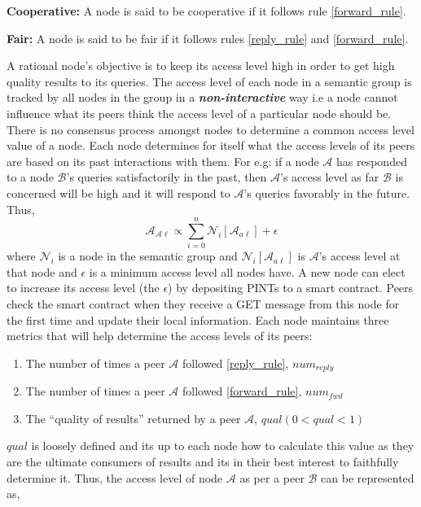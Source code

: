 \begin{definition}{\textbf{Cooperative:}}
	A node is said to be cooperative if it follows rule \ref{forward_rule}.
\end{definition}
\begin{definition}{\textbf{Fair:}}
	A node is said to be fair if it follows rules \ref{reply_rule} and \ref{forward_rule}.
\end{definition}
A rational node's objective is to keep its access level high in order to get high quality results to its queries. The access level of each node in a semantic group is tracked by all nodes in the group in a \textit{\textbf{non-interactive}} way i.e a node cannot influence what its peers think the access level of a particular node should be. There is no consensus process amongst nodes to determine a common access level value of a node. Each node determines for itself what the access levels of its peers are based on its past interactions with them. For e.g: if a node $\mathcal{A}$ has responded to a node $\mathcal{B}$'s queries satisfactorily in the past, then $\mathcal{A}$'s access level as far $\mathcal{B}$ is concerned will be high and it will respond to $\mathcal{A}$'s queries favorably in the future. Thus,
\newline
$$ \mathcal{A}_{\mathcal{A}\ell} \propto \sum_{i=0}^{n} \mathcal{N}_i[\mathcal{A}_{a\ell}] + \epsilon$$ 
where $\mathcal{N}_i$ is a node in the semantic group and $\mathcal{N}_i[\mathcal{A}_{a\ell}]$ is $\mathcal{A}$'s access level at that node and $\epsilon$ is a minimum access level all nodes have.
\newline
A new node can elect to increase its access level (the $\epsilon$) by depositing PINTs to a smart contract. Peers check the smart contract when they receive a GET message from this node for the first time and update their local information. Each node maintains three metrics that will help determine the access levels of its peers:
\begin{enumerate}
	\item The number of times a peer $\mathcal{A}$ followed \ref{reply_rule}, $num_{reply}$
	\item The number of times a peer $\mathcal{A}$ followed \ref{forward_rule}, $num_{fwd}$
	\item The ``quality of results'' returned by a peer $\mathcal{A}$, $qual (0 < qual < 1)$
\end{enumerate}
$qual$ is loosely defined and its up to each node how to calculate this value as they are the ultimate consumers of results and its in their best interest to faithfully determine it. Thus, the access level of node $\mathcal{A}$ as per a peer $\mathcal{B}$ can be represented as,
